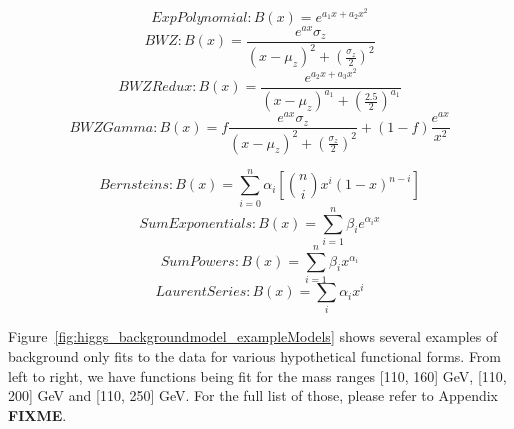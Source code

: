 \begin{center}
    \begin{equation}
        \label{eq:higgs_backgroundmodel_ExpPol2}
        ExpPolynomial: {B(x)} = {e^{a_{1}x + a_{2}x^2}}
    \end{equation}
    \begin{equation}
        \label{eq:higgs_backgroundmodel_BWZ}
        BWZ: {B(x)} = {\frac{e^{ax}\sigma_{z}}{(x-\mu_{z})^2 + (\frac{\sigma_{z}}{2})^2}}
     \end{equation}
     \begin{equation}
        \label{eq:higgs_backgroundmodel_BWZRedux}
        BWZRedux: {B(x)} = {\frac{e^{a_{2}x + a_{3}x^2}}{(x-\mu_{z})^{a_{1}} + (\frac{2.5}{2})^{a_{1}}}}
     \end{equation}
     \begin{equation}
        \label{eq:higgs_backgroundmodel_BWZGamma}
        BWZGamma: {B(x)} = {f\frac{e^{ax}\sigma_{z}}{(x-\mu_{z})^2 + (\frac{\sigma_{z}}{2})^2} + (1-f)\frac{e^{ax}}{x^2}}
     \end{equation}
\end{center}

\begin{center}
    \begin{equation}
        \label{eq:higgs_backgroundmodel_Bernstein}
        Bernsteins: {B(x)} = {\sum_{i=0}^{n} \alpha_i[\binom{n}{i}x^{i}(1-x)^{n-i}]}
    \end{equation}
    \begin{equation}
        \label{eq:higgs_backgroundmodel_SumExponentials}
        SumExponentials: {B(x)} = {\sum_{i=1}^{n} \beta_{i}e^{\alpha_{i}x}}
    \end{equation}
    \begin{equation}
        \label{eq:higgs_backgroundmodel_SumPowers}
        SumPowers: {B(x)} = {\sum_{i=1}^{n} \beta_{i}x^{\alpha_{i}}}
    \end{equation}
    \begin{equation}
        \label{eq:higgs_backgroundmodel_Laurent}
        LaurentSeries: {B(x)} = {\sum_{i} \alpha_{i}x^{i}}
    \end{equation}
\end{center}

Figure~\ref{fig:higgs_backgroundmodel_exampleModels} shows several examples of background only fits to the data for various hypothetical functional forms. From left to right, we have functions being fit for the mass ranges [110, 160] GeV, [110, 200] GeV and [110, 250] GeV. For the full list of those, please refer to Appendix \textbf{FIXME}.

